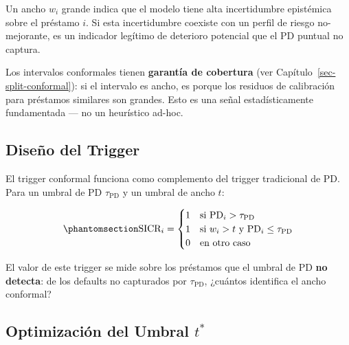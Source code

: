 \documentclass[
  spanish,
  11pt,
  letterpaper,
]{scrbook}
\theoremstyle{plain}
\theoremstyle{remark}
\begin{document}
Un ancho \(w_i\) grande indica que el modelo tiene alta incertidumbre
epistémica sobre el préstamo \(i\). Si esta incertidumbre coexiste con
un perfil de riesgo no-mejorante, es un indicador legítimo de deterioro
potencial que el PD puntual no captura.

\begin{tcolorbox}[enhanced jigsaw, arc=.35mm, bottomrule=.15mm, bottomtitle=1mm, breakable, colback=white, colbacktitle=quarto-callout-note-color!10!white, colframe=quarto-callout-note-color-frame, coltitle=black, left=2mm, leftrule=.75mm, opacityback=0, opacitybacktitle=0.6, rightrule=.15mm, title=\textcolor{quarto-callout-note-color}{\faInfo}\hspace{0.5em}{Fundamento Teórico}, titlerule=0mm, toprule=.15mm, toptitle=1mm]

Los intervalos conformales tienen \textbf{garantía de cobertura} (ver
Capítulo~\ref{sec-split-conformal}): si el intervalo es ancho, es porque
los residuos de calibración para préstamos similares son grandes. Esto
es una señal estadísticamente fundamentada --- no un heurístico ad-hoc.

\end{tcolorbox}

\subsection{Diseño del Trigger}\label{diseuxf1o-del-trigger}

El trigger conformal funciona como complemento del trigger tradicional
de PD. Para un umbral de PD \(\tau_{\text{PD}}\) y un umbral de ancho
\(t\):

\begin{equation}\protect\phantomsection\label{eq-sicr-trigger}{
\text{SICR}_i = \begin{cases}
1 & \text{si } \text{PD}_i > \tau_{\text{PD}} \\
1 & \text{si } w_i > t \text{ y } \text{PD}_i \leq \tau_{\text{PD}} \\
0 & \text{en otro caso}
\end{cases}
}\end{equation}

El valor de este trigger se mide sobre los préstamos que el umbral de PD
\textbf{no detecta}: de los defaults no capturados por
\(\tau_{\text{PD}}\), ¿cuántos identifica el ancho conformal?

\subsection{\texorpdfstring{Optimización del Umbral
\(t^*\)}{Optimización del Umbral t\^{}*}}\label{optimizaciuxf3n-del-umbral-t}
\end{document}
